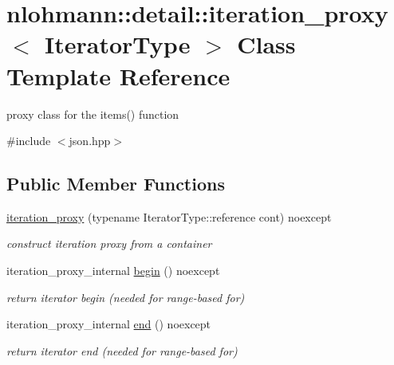\hypertarget{classnlohmann_1_1detail_1_1iteration__proxy}{}\section{nlohmann\+:\+:detail\+:\+:iteration\+\_\+proxy$<$ Iterator\+Type $>$ Class Template Reference}
\label{classnlohmann_1_1detail_1_1iteration__proxy}


proxy class for the items() function  




{\ttfamily \#include $<$json.\+hpp$>$}

\subsection*{Public Member Functions}
\begin{DoxyCompactItemize}
\item 
\hyperlink{classnlohmann_1_1detail_1_1iteration__proxy_afe257e972e3b4658ef2e355f7389d4a5}{iteration\+\_\+proxy} (typename Iterator\+Type\+::reference cont) noexcept\hypertarget{classnlohmann_1_1detail_1_1iteration__proxy_afe257e972e3b4658ef2e355f7389d4a5}{}\label{classnlohmann_1_1detail_1_1iteration__proxy_afe257e972e3b4658ef2e355f7389d4a5}

\begin{DoxyCompactList}\small\item\em construct iteration proxy from a container \end{DoxyCompactList}\item 
iteration\+\_\+proxy\+\_\+internal \hyperlink{classnlohmann_1_1detail_1_1iteration__proxy_a43612db469c82118fc648c3729e40cee}{begin} () noexcept\hypertarget{classnlohmann_1_1detail_1_1iteration__proxy_a43612db469c82118fc648c3729e40cee}{}\label{classnlohmann_1_1detail_1_1iteration__proxy_a43612db469c82118fc648c3729e40cee}

\begin{DoxyCompactList}\small\item\em return iterator begin (needed for range-\/based for) \end{DoxyCompactList}\item 
iteration\+\_\+proxy\+\_\+internal \hyperlink{classnlohmann_1_1detail_1_1iteration__proxy_a41303419d073f32fcf1956978410d816}{end} () noexcept\hypertarget{classnlohmann_1_1detail_1_1iteration__proxy_a41303419d073f32fcf1956978410d816}{}\label{classnlohmann_1_1detail_1_1iteration__proxy_a41303419d073f32fcf1956978410d816}

\begin{DoxyCompactList}\small\item\em return iterator end (needed for range-\/based for) \end{DoxyCompactList}\end{DoxyCompactItemize}


